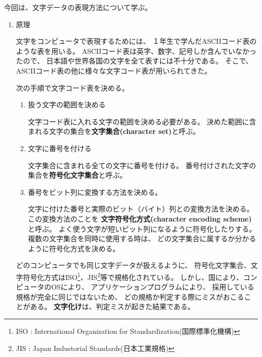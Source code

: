 \documentclass[uplatex,a4j,dvipdfmx]{ujarticle}
\begin{document}
\def\lstlistingname{リスト}


今回は、文字データの表現方法について学ぶ。

\begin{enumerate}

\item 原理

文字をコンピュータで表現するためには、
１年生で学んだASCIIコード表のような表を用いる。
ASCIIコード表は英字、数字、記号しか含んでいなかったので、
日本語や世界各国の文字を全て表すには不十分である。
そこで、ASCIIコード表の他に様々な文字コード表が用いられてきた。

次の手順で文字コード表を決める。

\begin{enumerate}
\item 扱う文字の範囲を決める

文字コード表に入れる文字の範囲を決める必要がある。
決めた範囲に含まれる文字の集合を{\bf 文字集合(character set)}と呼ぶ。

\item 文字に番号を付ける

文字集合に含まれる全ての文字に番号を付ける。
番号付けされた文字の集合を{\bf 符号化文字集合}と呼ぶ。

\item 番号をビット列に変換する方法を決める。

文字に付けた番号と実際のビット（バイト）列との変換方法を決める。
この変換方法のことを
{\bf 文字符号化方式(character encoding scheme)}と呼ぶ。
よく使う文字が短いビット列になるように符号化したりする。
複数の文字集合を同時に使用する時は、
どの文字集合に属するか分かるように符号化方式を決める。
\end{enumerate}

どのコンピュータでも同じ文字データが扱えるように、
符号化文字集合、文字符号化方式はISO\footnote{
ISO : International Organization for Standardization(国際標準化機構)
}、JIS\footnote{
JIS : Japan Industorial Standards(日本工業規格)
}等で規格化されている。
しかし、国により、コンピュータのOSにより、
アプリケーションプログラムにより、
採用している規格が完全に同じではないため、
どの規格か判定する際にミスがおこることがある。
{\bf 文字化け}は、判定ミスが起きた結果である。


\end{enumerate}
\end{document}
